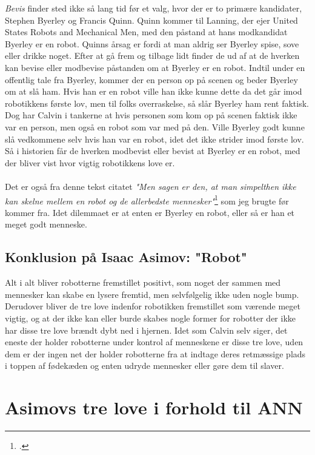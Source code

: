 \textit{Bevis} finder sted ikke så lang tid før et valg, hvor der er to primære kandidater, Stephen Byerley og Francis Quinn. Quinn kommer til Lanning, der ejer United States Robots and Mechanical Men,
med den påstand at hans modkandidat Byerley er en robot. Quinns årsag er fordi at man aldrig ser Byerley spise, sove eller drikke noget. Efter at gå frem og tilbage lidt finder de ud af
at de hverken kan bevise eller modbevise påstanden om at Byerley er en robot. Indtil under en offentlig tale fra Byerley, kommer der en person op på scenen og beder Byerley om at slå ham. Hvis han
er en robot ville han ikke kunne dette da det går imod robotikkens første lov, men til folks overraskelse, så slår Byerley ham rent faktisk. Dog har Calvin i tankerne at hvis personen som kom op
på scenen faktisk ikke var en person, men også en robot som var med på den. Ville Byerley godt kunne slå vedkommene selv hvis han var en robot, idet det ikke strider imod første lov. Så i
historien får de hverken modbevist eller bevist at Byerley er en robot, med der bliver vist hvor vigtig robotikkens love er.
\\
\\
Det er også fra denne tekst citatet \textit{"Men sagen er den, at man simpelthen ikke kan skelne mellem en robot og de allerbedste mennesker"}\footcite[194, l. 5]{robot} som jeg brugte
før kommer fra. Idet dilemmaet er at enten er Byerley en robot, eller så er han et meget godt menneske.

\subsection{Konklusion på Isaac Asimov: "Robot"}

Alt i alt bliver robotterne fremstillet positivt, som noget der sammen med mennesker kan skabe en lysere fremtid, men selvfølgelig ikke uden nogle bump. Derudover bliver
de tre love indenfor robotikken fremstillet som værende meget vigtig, og at der ikke kan eller burde skabes nogle former for robotter der ikke har disse tre love brændt
dybt ned i hjernen. Idet som Calvin selv siger, det eneste der holder robotterne under kontrol af menneskene er disse tre love, uden dem er der ingen net der
holder robotterne fra at indtage deres retmæssige plads i toppen af fødekæden og enten udryde mennesker eller gøre dem til slaver.

\section{Asimovs tre love i forhold til ANN}

